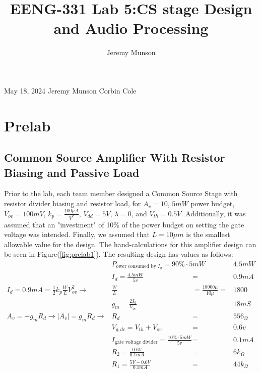 \documentclass[11pt]{article}
\title{EENG-331 Lab 5:\linebreak \linebreak CS stage Design and Audio Processing}
\author{Jeremy Munson}
\begin{document}
    \null \hfill May 18, 2024\linebreak
    \null \hfill Jeremy Munson\linebreak
    \null \hfill Corbin Cole\linebreak
    

    \vspace{-20px}
	\section{Prelab}
		\FloatBarrier
		\vspace{-5px}
	
	\subsection{Common Source Amplifier With Resistor Biasing and Passive Load}
		Prior to the lab, each team member designed a Common Source Stage with resistor divider biasing and resistor load, for $A_v = 10$, $5mW$ power budget, $V_{ov} = 100mV$, $k_p = \frac{100\mu A}{V^2}$, $V_{dd} = 5V$, $\lambda = 0$, and $V_{th} = 0.5V$. Additionally, it was assumed that an "investment" of 10\% of the power budget on setting the gate voltage was intended. Finally, we assumed that $L = 10\mu m$ is the smallest allowable value for the design. The hand-calculations for this amplifier design can be seen in Figure(\ref{fig:prelab1}). The resulting design has values as follows:\\
		\begin{align}
			\label{eqn:CS_POW_ID} &P_{\text{ower consumed by } I_d} = 90\% \cdot 5mW &=& 4.5mW \\
			\label{eqn:CS_ID} &I_d = \frac{4.5mW}{5v} &=& 0.9mA \\
			\label{eqn:CS_WL} I_d = 0.9mA = \frac{1}{2} k_p \frac{W}{L} V_{ov}^2 \rightarrow &\frac{W}{L} &= \frac{18000\mu}{10\mu} =& 1800 \\
			\label{eqn:CS_gm} &g_m = \frac{2I_d}{V_{ov}} &=& 18mS \\
			\label{eqn:CS_RD} A_v = -g_mR_d \rightarrow |A_v| = g_mR_d \rightarrow &R_d &=& 556_\Omega \\
			\label{eqn:CS_VG} &V_{g,dc} = V_{th} + V_{ov} &=& 0.6v \\
			\label{eqn:CS_GATE_BIAS} &I_{\text{gate voltage divider}} = \frac{10\% \cdot 5mW}{5v} &=& 0.1mA \\
			\label{eqn:CS_R2} &R_2 = \frac{0.6V}{0.1mA} &=& 6k_\Omega \\
			\label{eqn:CS_R1} &R_1 = \frac{5V - 0.6V}{0.1mA} &=& 44k_\Omega
		\end{align}
\end{document}
